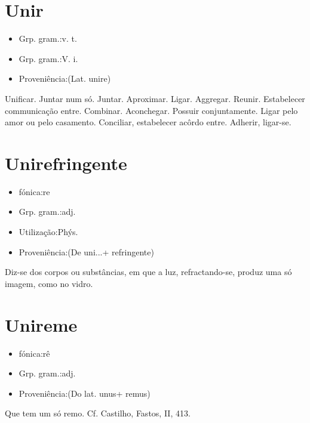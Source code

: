 \documentclass{article}
\begin{document}
\section{Unir}
\begin{itemize}
\item {Grp. gram.:v. t.}
\end{itemize}
\begin{itemize}
\item {Grp. gram.:V. i.}
\end{itemize}
\begin{itemize}
\item {Proveniência:(Lat. \textunderscore unire\textunderscore )}
\end{itemize}
Unificar.
Juntar num só.
Juntar.
Aproximar.
Ligar.
Aggregar.
Reunir.
Estabelecer communicação entre.
Combinar.
Aconchegar.
Possuir conjuntamente.
Ligar pelo amor ou pelo casamento.
Conciliar, estabelecer acôrdo entre.
Adherir, ligar-se.
\section{Unirefringente}
\begin{itemize}
\item {fónica:re}
\end{itemize}
\begin{itemize}
\item {Grp. gram.:adj.}
\end{itemize}
\begin{itemize}
\item {Utilização:Phýs.}
\end{itemize}
\begin{itemize}
\item {Proveniência:(De \textunderscore uni...\textunderscore  + \textunderscore refringente\textunderscore )}
\end{itemize}
Diz-se dos corpos ou substâncias, em que a luz, refractando-se, produz uma só imagem, como no vidro.
\section{Unireme}
\begin{itemize}
\item {fónica:rê}
\end{itemize}
\begin{itemize}
\item {Grp. gram.:adj.}
\end{itemize}
\begin{itemize}
\item {Proveniência:(Do lat. \textunderscore unus\textunderscore  + \textunderscore remus\textunderscore )}
\end{itemize}
Que tem um só remo. Cf. Castilho, \textunderscore Fastos\textunderscore , II, 413.
\end{document}
